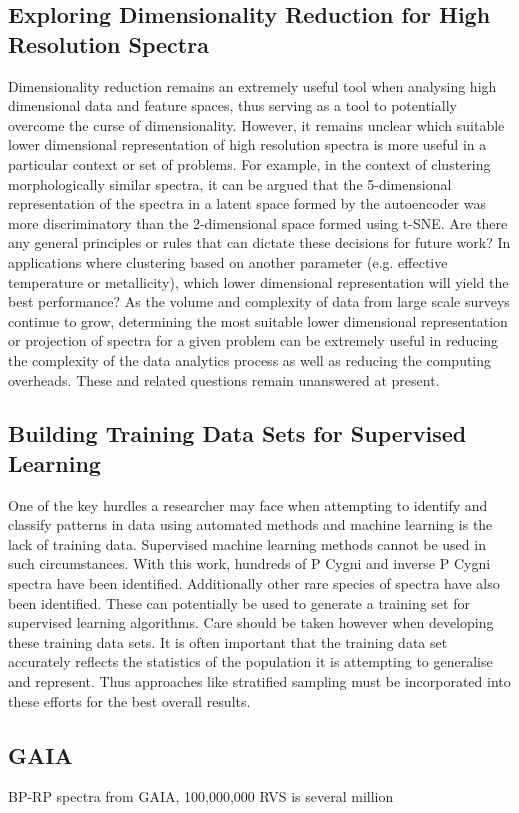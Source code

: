\subsection{Exploring Dimensionality Reduction for High Resolution Spectra}

Dimensionality reduction remains an extremely useful tool when analysing high dimensional data and feature spaces, thus serving as a tool to potentially overcome the curse of dimensionality. However, it remains unclear which suitable lower dimensional representation of high resolution spectra is more useful in a particular context or set of problems. For example, in the context of clustering morphologically similar spectra, it can be argued that the 5-dimensional representation of the spectra in a latent space formed by the autoencoder was more discriminatory than the 2-dimensional space formed using t-SNE. Are there any general principles or rules that can dictate these decisions for future work? In applications where clustering based on another parameter (e.g. effective temperature or metallicity), which lower dimensional representation will yield the best performance? As the volume and complexity of data from large scale surveys continue to grow, determining the most suitable lower dimensional representation or projection of spectra for a given problem can be extremely useful in reducing the complexity of the data analytics process as well as reducing the computing overheads. These and related questions remain unanswered at present.

\subsection{Building Training Data Sets for Supervised Learning}

One of the key hurdles a researcher may face when attempting to identify and classify patterns in data using automated methods and machine learning is the lack of training data. Supervised machine learning methods cannot be used in such circumstances. With this work, hundreds of P Cygni and inverse P Cygni spectra have been identified. Additionally other rare species of spectra have also been identified. These can potentially be used to generate a training set for supervised learning algorithms. Care should be taken however when developing these training data sets. It is often important that the training data set accurately reflects the statistics of the population it is attempting to generalise and represent. Thus approaches like stratified sampling must be incorporated into these efforts for the best overall results. 

\subsection{GAIA}

BP-RP spectra from GAIA, 100,000,000 RVS is several million